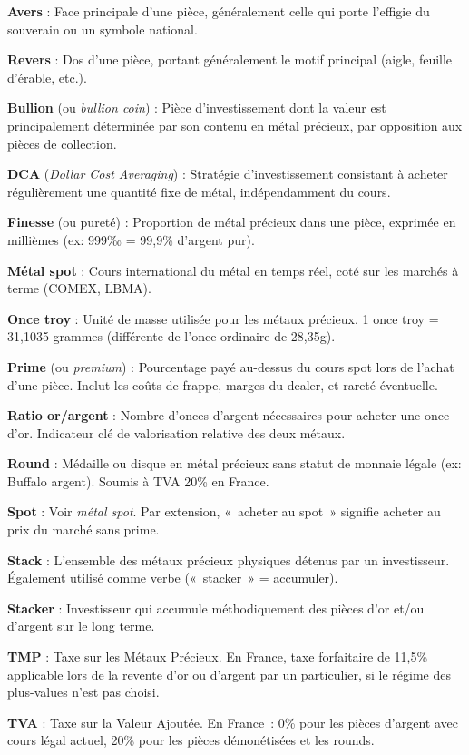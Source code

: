 \documentclass[14pt,a4paper]{extarticle}
\newcommand{\permil}{‰}
\begin{document}
\textbf{Avers} : Face principale d'une pièce, généralement celle qui porte l'effigie du souverain ou un symbole national.

\textbf{Revers} : Dos d'une pièce, portant généralement le motif principal (aigle, feuille d'érable, etc.).

\textbf{Bullion} (ou \textit{bullion coin}) : Pièce d'investissement dont la valeur est principalement déterminée par son contenu en métal précieux, par opposition aux pièces de collection.

\textbf{DCA} (\textit{Dollar Cost Averaging}) : Stratégie d'investissement consistant à acheter régulièrement une quantité fixe de métal, indépendamment du cours.

\textbf{Finesse} (ou pureté) : Proportion de métal précieux dans une pièce, exprimée en millièmes (ex: 999\permil{} = 99,9\% d'argent pur).

\textbf{Métal spot} : Cours international du métal en temps réel, coté sur les marchés à terme (COMEX, LBMA).

\textbf{Once troy} : Unité de masse utilisée pour les métaux précieux. 1 once troy = 31,1035 grammes (différente de l'once ordinaire de 28,35g).

\textbf{Prime} (ou \textit{premium}) : Pourcentage payé au-dessus du cours spot lors de l'achat d'une pièce. Inclut les coûts de frappe, marges du dealer, et rareté éventuelle.

\textbf{Ratio or/argent} : Nombre d'onces d'argent nécessaires pour acheter une once d'or. Indicateur clé de valorisation relative des deux métaux.

\textbf{Round} : Médaille ou disque en métal précieux sans statut de monnaie légale (ex: Buffalo argent). Soumis à TVA 20\% en France.

\textbf{Spot} : Voir \textit{métal spot}. Par extension, «~acheter au spot~» signifie acheter au prix du marché sans prime.

\textbf{Stack} : L'ensemble des métaux précieux physiques détenus par un investisseur. Également utilisé comme verbe («~stacker~» = accumuler).

\textbf{Stacker} : Investisseur qui accumule méthodiquement des pièces d'or et/ou d'argent sur le long terme.

\textbf{TMP} : Taxe sur les Métaux Précieux. En France, taxe forfaitaire de 11,5\% applicable lors de la revente d'or ou d'argent par un particulier, si le régime des plus-values n'est pas choisi.

\textbf{TVA} : Taxe sur la Valeur Ajoutée. En France~: 0\% pour les pièces d'argent avec cours légal actuel, 20\% pour les pièces démonétisées et les rounds.
\end{document}
